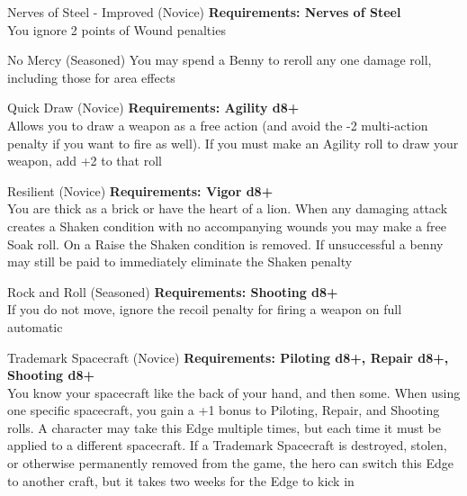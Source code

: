 \begin{multicols}{2}
\begin{genericsection}{Nerves of Steel - Improved (Novice)}
\textbf{Requirements: Nerves of Steel}\\
You ignore 2 points of Wound penalties
\end{genericsection}

\begin{genericsection}{No Mercy (Seasoned)}
You may spend a Benny to reroll any one damage roll, including those for area effects
\end{genericsection}

\begin{genericsection}{Quick Draw (Novice)}
\textbf{Requirements: Agility d8+}\\
Allows you to draw a weapon as a free action (and avoid the -2 multi-action penalty if you want to fire as well). If you must make an Agility roll to draw your weapon, add +2 to that roll
\end{genericsection}

\begin{genericsection}{Resilient (Novice)}
\textbf{Requirements: Vigor d8+}\\
You are thick as a brick or have the heart of a lion. When any damaging attack creates a Shaken condition with no accompanying wounds you may make a free Soak roll. On a Raise the Shaken condition is removed. If unsuccessful a benny may still be paid to immediately eliminate the Shaken penalty
\end{genericsection}

\begin{genericsection}{Rock and Roll (Seasoned)}
\textbf{Requirements: Shooting d8+}\\
If you do not move, ignore the recoil penalty for firing a weapon on full automatic
\end{genericsection}

\begin{genericsection}{Trademark Spacecraft (Novice)}
\textbf{Requirements: Piloting d8+, Repair d8+, Shooting d8+}\\
You know your spacecraft like the back of your hand, and then some. When using one specific spacecraft, you gain a +1 bonus to Piloting, Repair, and Shooting rolls. A character may take this Edge multiple times, but each time it must be applied to a different spacecraft. If a Trademark Spacecraft is destroyed, stolen, or otherwise permanently removed from the game,
the hero can switch this Edge to another craft, but it takes two weeks for the Edge to kick in
\end{genericsection}


\end{multicols}
